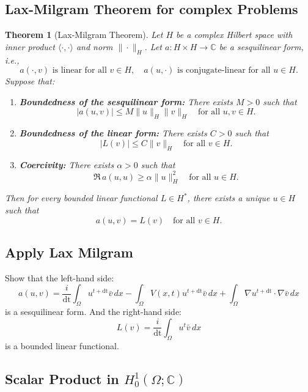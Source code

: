 \documentclass{article}
\theoremstyle{definition}
\theoremstyle{plain}
\newtheorem{theorem}[definition]{Theorem}
\theoremstyle{remark}
\newcommand{\dt}{\text{dt}}
\begin{document}
\subsection*{Lax-Milgram Theorem for complex Problems}

\begin{theorem}
[Lax-Milgram Theorem]
Let $H$ be a complex Hilbert space with inner product $\langle \cdot, \cdot \rangle$ and norm $\| \cdot \|_H$. Let $a : H \times H \to \mathbb{C}$ be a sesquilinear form, i.e.,
\[
a(\cdot, v) \text{ is linear for all } v \in H, \quad a(u, \cdot) \text{ is conjugate-linear for all } u \in H.
\]
Suppose that:
\begin{enumerate}
    \item \textbf{Boundedness of the sesquilinear form:} There exists $M > 0$ such that
    \[
    |a(u, v)| \leq M \|u\|_H \|v\|_H \quad \text{for all } u, v \in H.
    \]
    \item \textbf{Boundedness of the linear form:} There exists $C > 0$ such that
    \[
    |L(v)| \leq C \|v\|_H \quad \text{for all } v \in H.
    \]
    \item \textbf{Coercivity:} There exists $\alpha > 0$ such that
    \[
    \Re \, a(u, u) \geq \alpha \|u\|_H^2 \quad \text{for all } u \in H.
    \]
\end{enumerate}
Then for every bounded linear functional $L \in H^*$, there exists a unique $u \in H$ such that
\[
a(u, v) = L(v) \quad \text{for all } v \in H.
\]
\end{theorem}


\subsection*{Apply Lax Milgram}

Show that the left-hand side: 
$$a(u,v) = \frac{i}{\dt} \int_{\Omega} u^{t + \dt} \bar{v} \, dx -  \int_{\Omega} V(x,t) u^{t + \dt} \bar{v} \, dx + \int_{\Omega} \nabla u^{t + \dt} \cdot \nabla \bar{v} \, dx$$ is a sesquilinear form.
And the right-hand side: $$L(v) = \frac{i}{\dt} \int_{\Omega} u^t \bar{v} \, dx $$ is a bounded linear functional.

\subsection*{Scalar Product in $H_0^1(\Omega; \mathbb{C})$}
\end{document}
